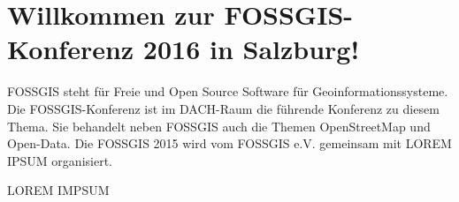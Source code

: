 \newpage
\section*{Willkommen zur FOSSGIS-Konferenz 2016 in Salzburg!} \label{welcome}
FOSSGIS steht für Freie und Open Source Software für Geoinformationssysteme. 
Die FOSSGIS-Konferenz ist im DACH-Raum die führende Konferenz zu diesem Thema. Sie behandelt neben
FOSSGIS auch die Themen OpenStreetMap und Open-Data.
Die FOSSGIS 2015 wird vom FOSSGIS e.V. gemeinsam mit LOREM IPSUM organisiert.

LOREM IMPSUM

\newpage
